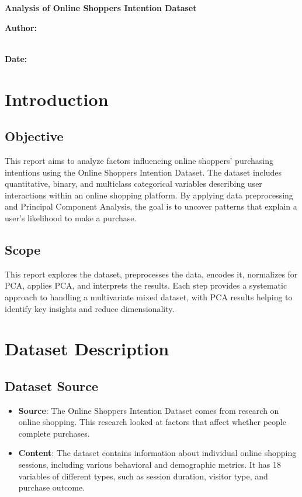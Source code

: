 \documentclass[a4paper, 12pt]{article}
\begin{document}
\begin{titlepage}
    \centering
    \vspace*{1in}
    \Huge
    \textbf{Analysis of Online Shoppers Intention Dataset}
    \vspace{1.5in}
    
    \LARGE
    \textbf{Author:} \\
    [Your Name] \\

    \vspace{0.5in}

    \textbf{Date:} \\
    [Submission Date]

    
    \vfill
\end{titlepage}

\tableofcontents
\newpage

\section{Introduction}

\subsection{Objective}
This report aims to analyze factors influencing online shoppers' purchasing intentions using the Online Shoppers Intention Dataset. The dataset includes quantitative, binary, and multiclass categorical variables describing user interactions within an online shopping platform. By applying data preprocessing and Principal Component Analysis, the goal is to uncover patterns that explain a user's likelihood to make a purchase.

\subsection{Scope}
This report explores the dataset, preprocesses the data, encodes it, normalizes for PCA, applies PCA, and interprets the results. Each step provides a systematic approach to handling a multivariate mixed dataset, with PCA results helping to identify key insights and reduce dimensionality.

\section{Dataset Description}

\subsection{Dataset Source}
\begin{itemize}
    \item \textbf{Source}: The Online Shoppers Intention Dataset comes from research on online shopping. This research looked at factors that affect whether people complete purchases.
    \item \textbf{Content}: The dataset contains information about individual online shopping sessions, including various behavioral and demographic metrics. It has 18 variables of different types, such as session duration, visitor type, and purchase outcome.
\end{itemize}
\end{document}
